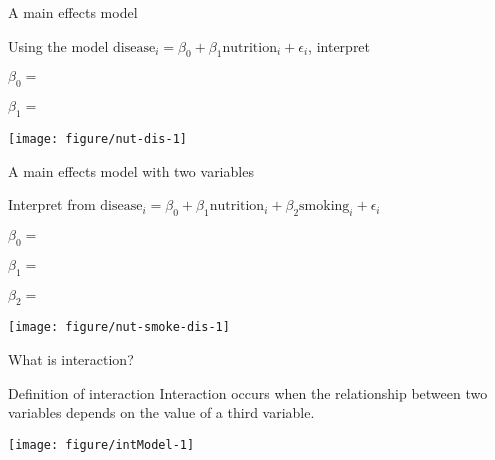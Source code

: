 \documentclass[table]{beamer}\usepackage[]{graphicx}\usepackage[]{color}
\makeatletter
\def\maxwidth{ %
  \ifdim\Gin@nat@width>\linewidth
    \linewidth
  \else
    \Gin@nat@width
  \fi
}
\newenvironment{knitrout}{}{} %
\makeatother
\begin{document}

\begin{frame}[t]{A main effects model}

Using the model $ \mbox{disease}_i = \beta_0 + \beta_1 \mbox{nutrition}_i + \epsilon_{i}$, interpret

\bigskip

$\beta_0 = $

\vspace{1.5cm}

$\beta_1 = $

\vspace{2cm}

\centering
\texttt{[image: figure/nut-dis-1]}

\end{frame}


\begin{frame}[fragile]{A main effects model with two variables}

Interpret from $ \mbox{disease}_i = \beta_0 + \beta_1 \mbox{nutrition}_i + \beta_2 \mbox{smoking}_i + \epsilon_{i}$

\bigskip

$\beta_0 = $

\vspace{.9cm}

$\beta_1 = $

\vspace{.9cm}

$\beta_2 = $


\vspace{.9cm}


\centering



\texttt{[image: figure/nut-smoke-dis-1]}


\end{frame}



\begin{frame}{What is interaction?}

\begin{block}{Definition of interaction}
Interaction occurs when the relationship between two variables depends on the value of a third variable.

\end{block}

\begin{knitrout}\tiny
{}\color{fgcolor}
\texttt{[image: figure/intModel-1]} 

\end{knitrout}





\end{frame}
\end{document}

